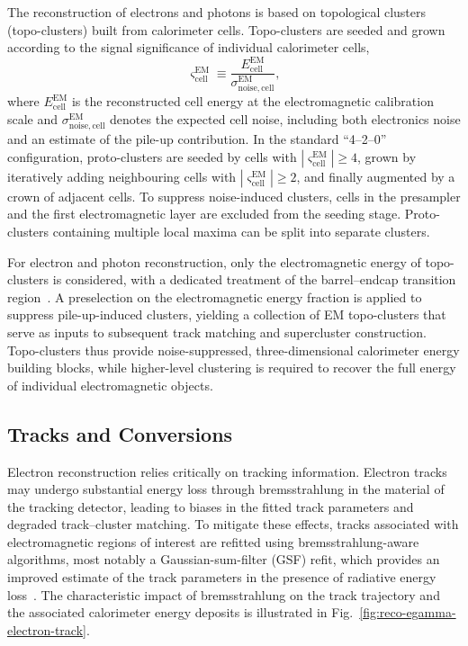 The reconstruction of electrons and photons is based on topological clusters
(topo-clusters) built from calorimeter cells.
Topo-clusters are seeded and grown according to the signal significance of
individual calorimeter cells,
\begin{equation}
\varsigma^{\mathrm{EM}}_{\mathrm{cell}} \equiv
\frac{E^{\mathrm{EM}}_{\mathrm{cell}}}{\sigma^{\mathrm{EM}}_{\mathrm{noise,cell}}},
\end{equation}
where $E^{\mathrm{EM}}_{\mathrm{cell}}$ is the reconstructed cell energy at the
electromagnetic calibration scale and $\sigma^{\mathrm{EM}}_{\mathrm{noise,cell}}$
denotes the expected cell noise, including both electronics noise and an estimate
of the pile-up contribution.
In the standard ``4--2--0'' configuration, proto-clusters are seeded by cells with
$|\varsigma^{\mathrm{EM}}_{\mathrm{cell}}|\ge 4$, grown by iteratively adding
neighbouring cells with $|\varsigma^{\mathrm{EM}}_{\mathrm{cell}}|\ge 2$, and
finally augmented by a crown of adjacent cells.
To suppress noise-induced clusters, cells in the presampler and the first
electromagnetic layer are excluded from the seeding stage.
Proto-clusters containing multiple local maxima can be split into separate
clusters.

For electron and photon reconstruction, only the electromagnetic energy of
topo-clusters is considered, with a dedicated treatment of the barrel--endcap
transition region~\cite{ATLASeGammaPerformance2019,ATLASegammaTopoSuperclusters2017}.
A preselection on the electromagnetic energy fraction is applied to suppress
pile-up-induced clusters, yielding a collection of EM topo-clusters that serve as
inputs to subsequent track matching and supercluster construction.
Topo-clusters thus provide noise-suppressed, three-dimensional calorimeter energy
building blocks, while higher-level clustering is required to recover the full
energy of individual electromagnetic objects.

\subsection{Tracks and Conversions}

Electron reconstruction relies critically on tracking information.
Electron tracks may undergo substantial energy loss through bremsstrahlung in the
material of the tracking detector, leading to biases in the fitted track
parameters and degraded track--cluster matching.
To mitigate these effects, tracks associated with electromagnetic regions of
interest are refitted using bremsstrahlung-aware algorithms, most notably a
Gaussian-sum-filter (GSF) refit, which provides an improved estimate of the track
parameters in the presence of radiative energy loss~\cite{ATLASGSF2012}.
The characteristic impact of bremsstrahlung on the track trajectory and the
associated calorimeter energy deposits is illustrated in
Fig.~\ref{fig:reco-egamma-electron-track}.

